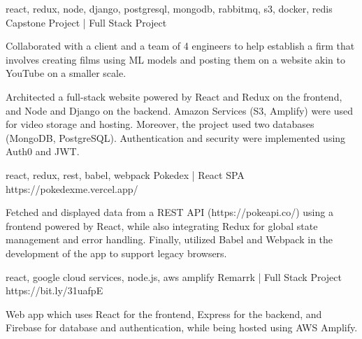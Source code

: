 


\begin{cventries}



  \cventry
    {react, redux, node, django, postgresql, mongodb, rabbitmq, s3, docker, redis } %
    {Capstone Project | Full Stack Project}  %
    {} %
    {} 
    { 
      \begin{cvitems} %
        \item {Collaborated with a client and a team of 4 engineers to help establish a firm that involves creating films using ML models and posting them on a website akin to YouTube on a smaller scale.} 
        \item {Architected a full-stack website powered by React and Redux on the frontend, and Node and Django on the backend. Amazon Services (S3, Amplify) were used for video storage and hosting. Moreover, the project used two databases (MongoDB, PostgreSQL). Authentication and security were implemented using Auth0 and JWT.}   
      \end{cvitems}
    }

  \cventry
    {react, redux, rest, babel, webpack} %
    {Pokedex | React SPA}  %
    {https://pokedexme.vercel.app/} %
    {} 
    {
      \begin{cvitems} %
        \item {Fetched and displayed data from a REST API (https://pokeapi.co/) using a frontend powered by React, while also integrating Redux for global state management and error handling. Finally, utilized Babel and Webpack in the development of the app to support legacy browsers.} 
      \end{cvitems}
    }

  \cventry
    {react, google cloud services, node.js, aws amplify} %
    {Remarrk | Full Stack Project}  %
    {https://bit.ly/31uafpE} %
    {} 
    {
      \begin{cvitems} %
        \item {Web app which uses React for the frontend, Express for the backend, and Firebase for database and authentication, while being hosted using AWS Amplify.} 
      \end{cvitems}
    }


\end{cventries}
